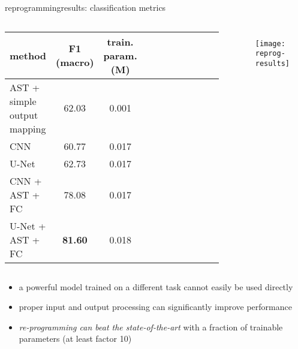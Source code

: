 \begin{frame}{reprogramming}{results: classification metrics}
		\vspace{-5mm}
    \begin{columns}
    \begin{footnotesize}
    \begin{table}[]
        \centering
        \begin{tabular}{l | c | c c c c c c c c c}
           method & F1 (macro) & train. param. (M) \\
           \hline
            AST + simple output mapping & 62.03 & 0.001\\
            CNN & 60.77 & 0.017\\
            U-Net & 62.73 & 0.017\\
            CNN + AST + FC & 78.08 & 0.017\\
            U-Net + AST + FC & \textbf{81.60} & 0.018
           
        \end{tabular}
    \end{table}
    \end{footnotesize}
    \begin{figure}%
    \texttt{[image: reprog-results]}%
    \end{figure}
    \end{columns}
		
    \bigskip
    \bigskip
    \begin{itemize}
        \item   a powerful model trained on a different task cannot easily be used directly
        \item   proper input and output processing can significantly improve performance
        \item   \textit{re-programming can beat the state-of-the-art} with a fraction of trainable parameters (at least factor 10)
    \end{itemize}
\end{frame}

